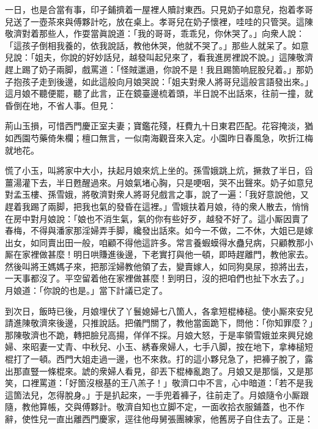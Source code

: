 一日，也是合當有事，印子鋪擠着一屋裡人贖討東西。只見奶子如意兒，抱着孝哥兒送了一壺茶來與傅夥計吃，放在桌上。孝哥兒在奶子懷裡，哇哇的只管哭。這陳敬濟對着那些人，作耍當眞說道：「我的哥哥，乖乖兒，你休哭了。」向衆人說：「這孩子倒相我養的，依我說話，教他休哭，他就不哭了。」{}那些人就呆了。如意兒說：「姐夫，你說的好妙話兒，越發叫起兒來了，看我進房裡說不說。」這陳敬濟趕上踢了奶子兩脚，戲罵道：「怪賊邋遢，你說不是！我且踢箇响屁股兒着。」{}那奶子抱孩子走到後邊，如此這般向月娘哭說：「姐夫對衆人將哥兒這般言語發出來。」這月娘不聽便罷，聽了此言，正在鏡臺邊梳着頭，半日說不出話來，往前一撞，就昏倒在地，不省人事。但見：

\begin{myquote}
荊山玉損，可惜西門慶正室夫妻；寶鑑花殘，枉費九十日東君匹配。花容掩淡，猶如西園芍藥倚朱欄；檀口無言，一似南海觀音來入定。小園昨日春風急，吹折江梅就地花。
\end{myquote}

慌了小玉，叫將家中大小，扶起月娘來炕上坐的。孫雪娥跳上炕，撅救了半日，舀薑湯灌下去，半日甦醒過來。月娘氣堵心胸，只是哽咽，哭不出聲來。奶子如意兒對孟玉樓、孫雪娥，將敬濟對衆人將哥兒戲言之事，說了一遍：「我好意說他，又趕着我踢了兩脚，把我也氣的發昏在這裡。」雪娥扶着月娘，待的衆人散去，悄悄在房中對月娘說：「娘也不消生氣，氣的你有些好歹，越發不好了。這小厮因賣了春梅，不得與潘家那淫婦弄手脚，纔發出話來。如今一不做，二不休，大姐已是嫁出女，如同賣出田一般，咱顧不得他這許多。常言養蝦蟆得水蠱兒病，只顧教那小厮在家裡做甚麼！明日哄賺進後邊，下老實打與他一頓，即時趕離門，教他家去。然後叫將王媽媽子來，把那淫婦教他領了去，變賣嫁人，如同狗臭尿，掠將出去，一天事都沒了。平空留着他在家裡做甚麼！到明日，沒的把咱們也扯下水去了。」{}月娘道：「你說的也是。」當下計議已定了。

到次日，飯時已後，月娘埋伏了丫鬟媳婦七八箇人，各拿短棍棒槌。使小厮來安兒請進陳敬濟來後邊，只推說話。把儀門關了，教他當面跪下，問他：「你知罪麼？」那陳敬濟也不跪，轉把臉兒高揚，佯佯不採。月娘大怒，于是率領雪娥並來興兒媳婦、來昭妻一丈青、中秋兒、小玉、綉春衆婦人，七手八脚，按在地下，拿棒槌短棍打了一頓。西門大姐走過一邊，也不來救。打的這小夥兒急了，把褲子脫了，露出那直豎一條棍來。{}諕的衆婦人看見，卻丟下棍棒亂跑了。月娘又是那惱，又是那笑，口裡罵道：「好箇沒根基的王八羔子！」敬濟口中不言，心中暗道：「若不是我這箇法兒，怎得脫身。」于是扒起來，一手兜着褲子，往前走了。月娘隨令小厮跟隨，教他算帳，交與傅夥計。敬濟自知也立脚不定，一面收拾衣服鋪蓋，也不作辭，使性兒一直出離西門慶家，逕往他母舅張團練家，他舊房子自住去了。正是：

